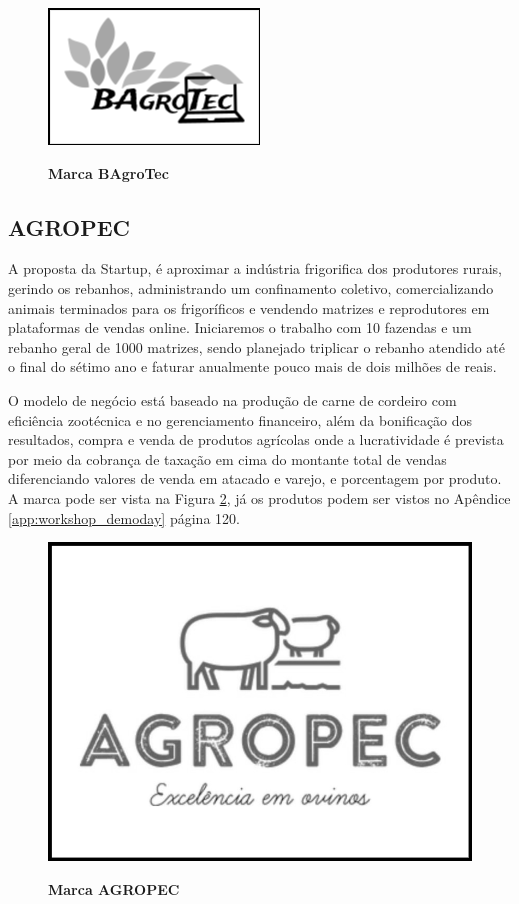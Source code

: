\begin{figure}[H]
\centering
\caption{\textbf{Marca BAgroTec}}
\includegraphics[scale=0.9]{Imagens/bagrotec.png}
\label{figura_15}
\end{figure}


\subsection{AGROPEC}


A proposta da Startup, é aproximar a indústria frigorifica dos produtores rurais, gerindo os rebanhos, administrando um confinamento coletivo, comercializando animais terminados para os frigoríficos e vendendo matrizes e reprodutores em plataformas de vendas online. Iniciaremos o trabalho com 10 fazendas e um rebanho geral de 1000 matrizes, sendo planejado triplicar o rebanho atendido até o final do sétimo ano e faturar anualmente pouco mais de dois milhões de reais.

O modelo de negócio está baseado na produção de carne de cordeiro com eficiência zootécnica e no gerenciamento financeiro, além da bonificação dos resultados, compra e venda de produtos agrícolas onde a lucratividade é prevista por meio da cobrança de taxação em cima do montante total de vendas diferenciando valores de venda em atacado e varejo, e porcentagem por produto. A marca pode ser vista na Figura \ref{figura_18}, já os produtos podem ser vistos no Apêndice \ref{app:workshop_demoday} página 120.


\begin{figure}[H]
\centering
\caption{\textbf{Marca AGROPEC}}
\includegraphics[scale=0.2]{Imagens/agropec.jpg}
\label{figura_18}
\end{figure}

